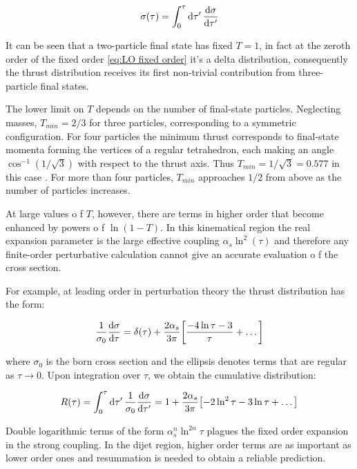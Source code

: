 \documentclass[../main.tex]{subfiles}
\begin{document}
\begin{equation}\label{eq:cross_section}
    \sigma(\tau) = \int^\tau_0 \dd{\tau'} \dv{\sigma}{\tau'}
\end{equation}

It can be seen that a two-particle final state has fixed $T = 1$, in fact at the zeroth order of the fixed order \cref{eq:LO fixed order} it's 
a delta distribution, consequently the thrust distribution receives its first non-trivial contribution from three-particle final states.

The lower limit on $T$ depends on the number of final-state particles.
Neglecting masses, $T_{min} = 2/3$ for three particles, corresponding to a symmetric
configuration. For four particles the minimum thrust corresponds to final-state
momenta forming the vertices of a regular tetrahedron, each making an angle
$\cos^{-1}(1/\sqrt{3})$ with respect to the thrust axis. Thus $T_{min} = 1/\sqrt{3} = 0.577$ in this
case . For more than four particles, $T_{min}$ approaches $1/2$ from above as the number of particles increases.

At large values o f $T$, however, there are terms in higher order that become enhanced by powers o f $\ln(1 - T)$.
In this kinematical region the real expansion parameter is the
large effective coupling $\alpha_s \ln^2(\tau)$ and therefore
any finite-order perturbative calculation cannot give an accurate evaluation o f the cross section.

For example, at leading order in perturbation theory the thrust distribution has the form:

\begin{equation}\label{eq:LO fixed order}
    \frac{1}{\sigma_0}\dv{\sigma}{\tau} = \delta(\tau) + \frac{2\alpha_s}{3\pi} \qty[\frac{-4 \ln \tau - 3}{\tau} + \dots]
\end{equation}

where $\sigma_0$ is the born cross section and the ellipsis denotes terms that are regular as $\tau \to 0$. 
Upon integration over $\tau$, we obtain the cumulative distribution:

\begin{equation}
    R(\tau) = \int_0^\tau \dd{\tau'} \frac{1}{\sigma_0}\dv{\sigma}{\tau'} = 1 + \frac{2\alpha_s}{3\pi} \qty[-2 \ln^2 \tau - 3 \ln \tau + \dots] 
\end{equation}

Double logarithmic terms of the form $\alpha_s^n \ln^{2n}\tau$ plagues the fixed order expansion in the strong coupling. In the dijet region, higher order 
terms are as important as lower order ones and resummation is needed to obtain a reliable prediction.
\end{document}
